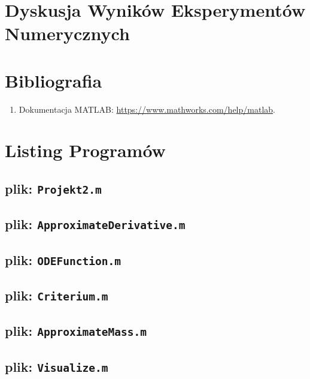 \documentclass[a4paper, 12pt, twoside, openany]{article}
\begin{document}
	
	\section{Dyskusja Wyników Eksperymentów Numerycznych}
	
	\newpage
	
	\section*{Bibliografia}
	\begin{enumerate}
		\item Dokumentacja MATLAB: \url{https://www.mathworks.com/help/matlab}.
	\end{enumerate}
	
	\newpage
	
	\section*{Listing Programów}
	
	\subsection*{plik: \texttt{Projekt2.m}}\vspace{-0.5em}
	
	\subsection*{plik: \texttt{ApproximateDerivative.m}}\vspace{-0.5em}
	
	\subsection*{plik: \texttt{ODEFunction.m}}\vspace{-0.5em}
	
	\subsection*{plik: \texttt{Criterium.m}}\vspace{-0.5em}
	
	\subsection*{plik: \texttt{ApproximateMass.m}}\vspace{-0.5em}
	
	\subsection*{plik: \texttt{Visualize.m}}\vspace{-0.5em}
	
\end{document}
